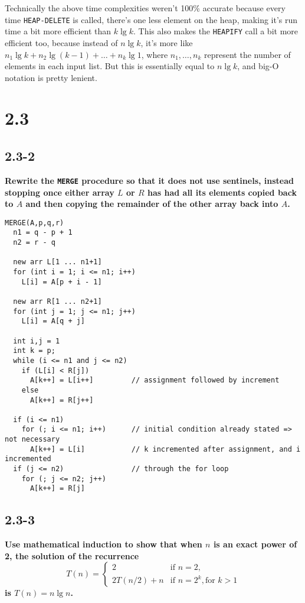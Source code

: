 \documentclass[11pt]{article}
\begin{document}
 Technically the above time complexities weren't 100\% accurate because every time 
 \texttt{HEAP-DELETE} is called, there's one less element on the heap, making it's run time a bit 
 more efficient than $k \lg k$.  This also makes the \texttt{HEAPIFY} call a bit more efficient too, 
 because instead of $n \lg k$, it's more like $n_1 \lg k + n_2 \lg (k-1) + \dots + n_k \lg 1$, where 
 $n_1, \dots, n_k$ represent the number of elements in each input list.  But this is essentially 
 equal to $n \lg k$, and big-O notation is pretty lenient.
 \newpage

 \section*{2.3}

 \subsection*{2.3-2}
 \textbf{Rewrite the \texttt{MERGE} procedure so that it does not use sentinels, instead stopping 
 once either array $L$ or $R$ has had all its elements copied back to $A$ and then copying the 
 remainder of the other array back into $A$.}

 \begin{verbatim}
MERGE(A,p,q,r)
  n1 = q - p + 1 
  n2 = r - q 

  new arr L[1 ... n1+1]
  for (int i = 1; i <= n1; i++)
    L[i] = A[p + i - 1]

  new arr R[1 ... n2+1]
  for (int j = 1; j <= n1; j++)
    L[i] = A[q + j]

  int i,j = 1
  int k = p;
  while (i <= n1 and j <= n2)
    if (L[i] < R[j])
      A[k++] = L[i++]         // assignment followed by increment
    else
      A[k++] = R[j++]         

  if (i <= n1)
    for (; i <= n1; i++)      // initial condition already stated => not necessary
      A[k++] = L[i]           // k incremented after assignment, and i incremented 
  if (j <= n2)                // through the for loop
    for (; j <= n2; j++)
      A[k++] = R[j]

 \end{verbatim}
 
 \subsection*{2.3-3}
 \textbf{Use mathematical induction to show that when $n$ is an exact power of 2, the solution 
 of the recurrence}
 \[
   T(n) = 
   \begin{cases}
     2 & \text{if } n = 2, \\
     2T(n/2) + n & \text{if } n = 2^k, \text{for } k > 1
   \end{cases}
 \]
 \textbf{is $T(n) = n \lg n$.} \\
\end{document}

